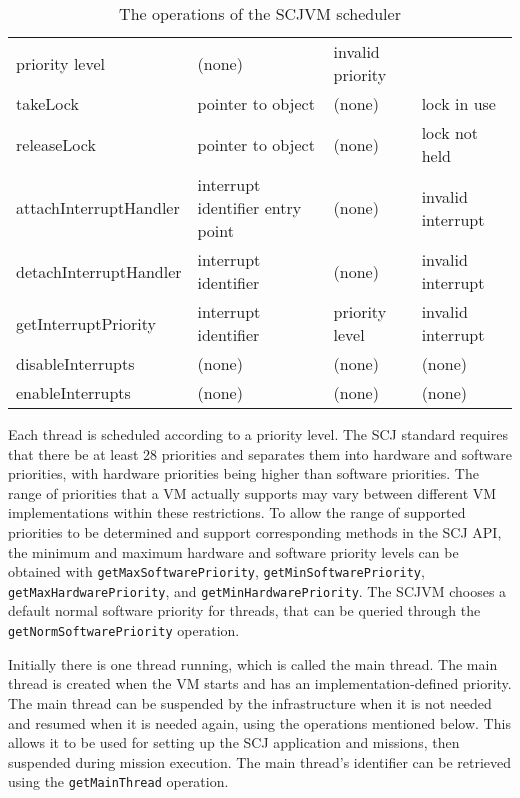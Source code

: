 \documentclass[a4paper,10pt]{report}
\begin{document}
\begin{table}[ht]
\begin{tabular}{|l|p{3cm}|p{2.2cm}|p{2.7cm}|}
      priority level &
      (none) &
      invalid priority
    \\takeLock &
      pointer to object &
      (none) &
      lock in use
    \\releaseLock &
      pointer to object &
      (none) &
      lock not held
    \\attachInterruptHandler &
      interrupt identifier \newline
      entry point &
      (none) &
      invalid interrupt
    \\detachInterruptHandler &
      interrupt identifier &
      (none) &
      invalid interrupt
    \\getInterruptPriority &
      interrupt identifier &
      priority level &
      invalid interrupt
    \\disableInterrupts &
      (none) &
      (none) &
      (none)
    \\enableInterrupts &
      (none) &
      (none) &
      (none)
  \end{tabular}
  \caption{The operations of the SCJVM scheduler}
  \label{scheduler-table}
\end{table}

Each thread is scheduled according to a priority level. The SCJ standard
requires that there be at least 28 priorities and separates them into hardware
and software priorities, with hardware priorities being higher than software
priorities. The range of priorities that a VM actually supports may vary between
different VM implementations within these restrictions. To allow the range of
supported priorities to be determined and support corresponding methods in the
SCJ API, the minimum and maximum hardware and software priority levels can be
obtained with \texttt{get\-Max\-Soft\-ware\-Pri\-or\-ity},
\texttt{get\-Min\-Soft\-ware\-Pri\-or\-ity},
\texttt{get\-Max\-Hard\-ware\-Pri\-or\-ity}, and
\texttt{get\-Min\-Hard\-ware\-Pri\-or\-ity}. The SCJVM chooses a default normal
software priority for threads, that can be queried through the
\texttt{get\-Norm\-Soft\-ware\-Pri\-or\-ity} operation.

Initially there is one thread running, which is called the main thread. The main
thread is created when the VM starts and has an implementation-defined
priority. The main thread can be suspended by the infrastructure when it is not
needed and resumed when it is needed again, using the operations mentioned
below. This allows it to be used for setting up the SCJ application and
missions, then suspended during mission execution. The main thread's identifier
can be retrieved using the \texttt{get\-Main\-Thread} operation.
\end{document}
